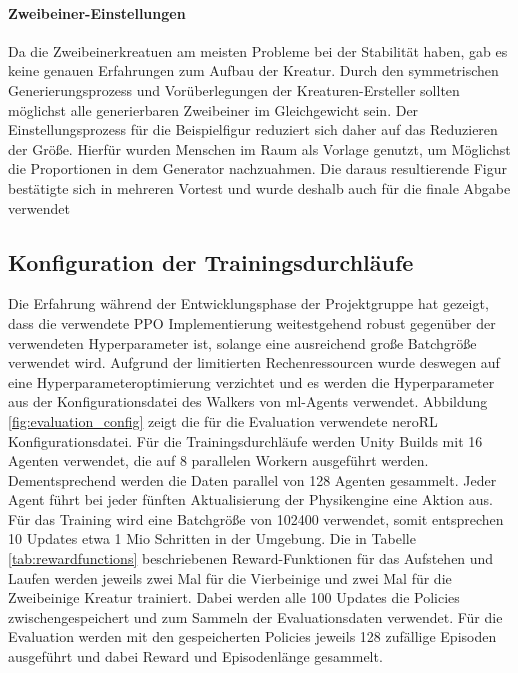 \paragraph{Zweibeiner-Einstellungen}
Da die Zweibeinerkreatuen am meisten Probleme bei der Stabilität haben, gab es keine genauen Erfahrungen zum Aufbau der Kreatur. Durch den symmetrischen Generierungsprozess und Vorüberlegungen der Kreaturen-Ersteller sollten möglichst alle generierbaren Zweibeiner im Gleichgewicht sein. Der Einstellungsprozess für die Beispielfigur reduziert sich daher auf das Reduzieren der Größe. Hierfür wurden Menschen im Raum als Vorlage genutzt, um Möglichst die Proportionen in dem Generator nachzuahmen. Die daraus resultierende Figur bestätigte sich in mehreren Vortest und wurde deshalb auch für die finale Abgabe verwendet

\subsection{Konfiguration der Trainingsdurchläufe}
Die Erfahrung während der Entwicklungsphase der Projektgruppe hat gezeigt, dass die verwendete PPO Implementierung weitestgehend robust gegenüber der verwendeten Hyperparameter ist, solange eine ausreichend große Batchgröße verwendet wird. Aufgrund der limitierten Rechenressourcen wurde deswegen auf eine Hyperparameteroptimierung verzichtet und es werden die Hyperparameter aus der Konfigurationsdatei des Walkers von ml-Agents verwendet. Abbildung \ref{fig:evaluation_config} zeigt die für die Evaluation verwendete neroRL Konfigurationsdatei. 
Für die Trainingsdurchläufe werden Unity Builds mit 16 Agenten verwendet, die auf 8 parallelen Workern ausgeführt werden. Dementsprechend werden die Daten parallel von 128 Agenten gesammelt. Jeder Agent führt bei jeder fünften Aktualisierung der Physikengine eine Aktion aus. Für das Training wird eine Batchgröße von 102400 verwendet, somit entsprechen 10 Updates etwa 1 Mio Schritten in der Umgebung.
Die in Tabelle \ref{tab:rewardfunctions} beschriebenen Reward-Funktionen für das Aufstehen und Laufen werden jeweils zwei Mal für die Vierbeinige und zwei Mal für die Zweibeinige Kreatur trainiert. Dabei werden alle 100 Updates die Policies zwischengespeichert und zum Sammeln der Evaluationsdaten verwendet. Für die Evaluation werden mit den gespeicherten Policies jeweils 128 zufällige Episoden ausgeführt und dabei Reward und Episodenlänge gesammelt.

